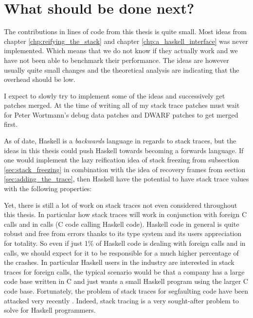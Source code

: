 \section{What should be done next?}

The contributions in lines of code from this thesis is quite small.
Most ideas from chapter \ref{chp:reifying_the_stack} and chapter
\ref{chp:a_haskell_interface} was never implemented. Which means that we
do not know if they actually work and we have not been able to benchmark
their performance. The ideas are however usually quite small changes and
the theoretical analysis are indicating that the overhead should be low.

I expect to slowly try to implement some of the ideas and successively
get patches merged. At the time of writing all of my stack trace patches
must wait for Peter Wortmann's debug data patches and DWARF patches to
get merged first.

As of date, Haskell is a \emph{backwards} language in regards to stack
traces, but the ideas in this thesis could push Haskell towards becoming
a forwards language. If one would implement the lazy reification
idea of stack freezing from subsection \ref{sec:stack_freezing}
in combination with the idea of recovery frames from section
\ref{sec:adding_the_trace}, then Haskell have the potential to have
stack trace values with the following properties:




Yet, there is still a lot of work on stack traces not even considered
throughout this thesis. In particular how stack traces will work in
conjunction with foreign C calls and in calls (C code calling Haskell
code). Haskell code in general is quite robust and free from errors
thanks to its type system and its users appreciation for totality. So
even if just 1\% of Haskell code is dealing with foreign calls and in
calls, we should expect for it to be responsible for a much higher
percentage of the crashes. In particular Haskell users in the industry
are interested in stack traces for foreign calls, the typical scenario
would be that a company has a large code base written in C and just
wants a small Haskell program using the larger C code base. Fortunately,
the problem of stack traces for segfaulting code have been attacked very
recently \cite{github_blitzcode_ghc_stack}. Indeed, stack tracing is a
very sought-after problem to solve for Haskell programmers.
